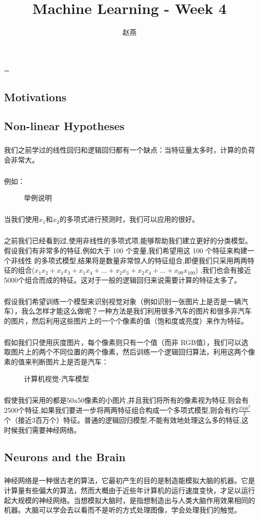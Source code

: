 \documentclass{article}
\title{Machine Learning - Week 4}
\author{赵燕}
\date{}
\begin{document}
 
\hfuzz=\maxdimen
{}
\begin{CJK}{UTF8}{gbsn} 
\maketitle
\renewcommand\contentsname{目录}
\renewcommand\figurename{图}
\tableofcontents
\newpage

\section{Motivations}
\subsection{Non-linear Hypotheses}
\subparagraph{}
我们之前学过的线性回归和逻辑回归都有一个缺点：当特征量太多时，计算的负荷会非常大。
\subparagraph{}
例如：
\begin{figure}[H]
\caption{举例说明}
\label{fig:402}
\end{figure}
\subparagraph{}
当我们使用$x_1$和$x_2$的多项式进行预测时，我们可以应用的很好。
\subparagraph{}
之前我们已经看到过,使用非线性的多项式项,能够帮助我们建立更好的分类模型。假设我们有非常多的特征,例如大于 100 个变量,我们希望用这 100 个特征来构建一个非线性
的多项式模型,结果将是数量非常惊人的特征组合,即便我们只采用两两特征的组合($x_1x_2+x_1x_3+x_1x_4+...+x_2x_3+x_2x_4+...+x_99x_100$) ,我们也会有接近 5000个组合而成的特征。这对于一般的逻辑回归来说需要计算的特征太多了。
\subparagraph{}
假设我们希望训练一个模型来识别视觉对象（例如识别一张图片上是否是一辆汽车），我么怎样才能这么做呢？一种方法是我们利用很多汽车的图片和很多非汽车的图片，然后利用这些图片上的一个个像素的值（饱和度或亮度）来作为特征。
\subparagraph{}
假如我们只使用灰度图片，每个像素则只有一个值（而非
RGB值），我们可以选取图片上的两个不同位置的两个像素，然后训练一个逻辑回归算法，利用这两个像素的值来判断图片上是否是汽车：
\begin{figure}[H]
\caption{计算机视觉-汽车模型}
\label{fig:403}
\end{figure}
\subparagraph{}
假使我们采用的都是50x50像素的小图片,并且我们将所有的像素视为特征,则会有2500个特征,如果我们要进一步将两两特征组合构成一个多项式模型,则会有约$\frac{2500^2}{2}$ 个（接近3百万个）特征。普通的逻辑回归模型,不能有效地处理这么多的特征,这时候我们需要神经网络。
\subsection{Neurons and the Brain}
\subparagraph{}
神经网络是一种很古老的算法，它最初产生的目的是制造能模拟大脑的机器。它是计算量有些偏大的算法，然而大概由于近些年计算机的运行速度变快，才足以运行起大规模的神经网络。当想模拟大脑时，是指想制造出与人类大脑作用效果相同的机器。大脑可以学会去以看而不是听的方式处理图像，学会处理我们的触觉。

\end{CJK}
\end{document}
